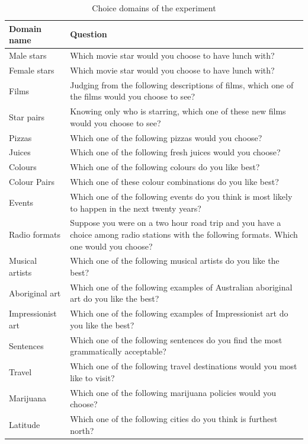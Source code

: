\documentclass[11pt,letter]{article}
\begin{document}
\begin{table}[h!]
  \begin{center}
    \caption{Choice domains of the experiment}
    \label{t:domains}
    \begin{small}
    \begin{tabular}{lp{12cm}}
      Domain name & Question\\
      \hline
      	Male stars & Which movie star would you choose to have lunch with? \\
		Female stars & Which movie star would you choose to have lunch with? \\
		Films & Judging from the following descriptions of films, which one of the films would you choose to see? \\
		Star pairs & Knowing only who is starring, which one of these new films would you choose to see? \\
		Pizzas & Which one of the following pizzas would you choose? \\
		Juices & Which one of the following fresh juices would you choose? \\
		Colours & Which one of the following colours do you like best? \\
		Colour Pairs & Which one of these colour combinations do you like best? \\
		Events & Which one of the following events do you think is most likely to happen in the next twenty years? \\
		Radio formats & Suppose you were on a two hour road trip and you have a choice among radio stations with the following formats.
Which one would you choose? \\
		Musical artists & Which one of the following musical artists do you like the best? \\
		Aboriginal art & Which one of the following examples of Australian aboriginal art do you like the best? \\
		Impressionist art & Which one of the following examples of Impressionist art do you like the best? \\
		Sentences & Which one of the following sentences do you find the most grammatically acceptable? \\
		Travel & Which one of the following travel destinations would you most like to visit? \\
		Marijuana & Which one of the following marijuana policies would you choose? \\
		Latitude & Which one of the following cities do you think is furthest north? \\

\end{tabular}
\end{small}
\end{center}
\end{table}
\end{document}
